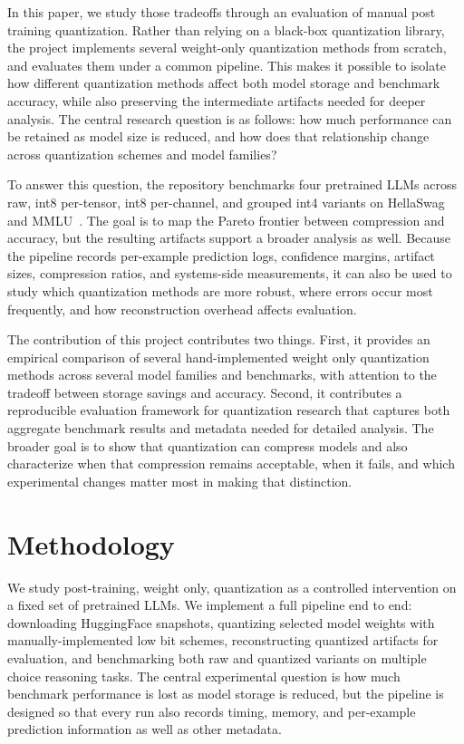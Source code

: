 \documentclass[11pt,twocolumn]{article}
\begin{document}
In this paper, we study those tradeoffs through an evaluation of manual post training quantization. Rather than relying on a black-box quantization library, the project implements several weight-only quantization methods from scratch, and evaluates them under a common pipeline. This makes it possible to isolate how different quantization methods affect both model storage and benchmark accuracy, while also preserving the intermediate artifacts needed for deeper analysis. The central research question is as follows: how much performance can be retained as model size is reduced, and how does that relationship change across quantization schemes and model families?

To answer this question, the repository benchmarks four pretrained LLMs across raw, int8 per-tensor, int8 per-channel, and grouped int4 variants on HellaSwag~\cite{zellers2019hellaswag} and MMLU~\cite{hendrycks2021mmlu}. The goal is to map the Pareto frontier between compression and accuracy, but the resulting artifacts support a broader analysis as well. Because the pipeline records per-example prediction logs, confidence margins, artifact sizes, compression ratios, and systems-side measurements, it can also be used to study which quantization methods are more robust, where errors occur most frequently, and how reconstruction overhead affects evaluation. 

The contribution of this project contributes two things. First, it provides an empirical comparison of several hand-implemented weight only quantization methods across several model families and benchmarks, with attention to the tradeoff between storage savings and accuracy. Second, it contributes a reproducible evaluation framework for quantization research that captures both aggregate benchmark results and metadata needed for detailed analysis. The broader goal is to show that quantization can compress models and also characterize when that compression remains acceptable, when it fails, and which experimental changes matter most in making that distinction.

\section{Methodology}
We study post-training, weight only, quantization as a controlled intervention on a fixed set of pretrained LLMs. We implement a full pipeline end to end: downloading HuggingFace snapshots, quantizing selected model weights with manually-implemented low bit schemes, reconstructing quantized artifacts for evaluation, and benchmarking both raw and quantized variants on multiple choice reasoning tasks. The central experimental question is how much benchmark performance is lost as model storage is reduced, but the pipeline is designed so that every run also records timing, memory, and per-example prediction information as well as other metadata.
\end{document}

